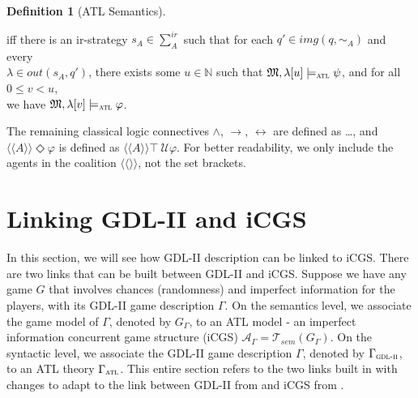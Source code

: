 \documentclass{article}
\theoremstyle{theorem}
\theoremstyle{lemma}
\theoremstyle{definition}
\newtheorem{definition}{Definition}[section]
\theoremstyle{remark}
\begin{document}
\begin{definition}[ATL Semantics]
\begin{tabbing}
        \>\hspace{1cm} iff there is an ir-strategy $s_A \in \sum_{A}^{ir}$ such that for each $q' \in img(q, \sim_A)$ and every \\
        \>\hspace{1cm} $\lambda \in out(s_A, q')$, there exists some $u \in \mathbb{N}$ such that $\mathfrak{M}, \lambda[u] \models_\textsc{atl} \psi$,  and for all $0 \leq v < u$, \\
        \>\hspace{1cm} we have $\mathfrak{M}, \lambda[v] \models_\textsc{atl} \varphi$.
    \end{tabbing}
    The remaining classical logic connectives $\wedge$, $\rightarrow$, $\leftrightarrow$ are defined as \ldots, and $\langle{\langle{A} \rangle}\rangle \Diamond \varphi$ is defined as $\langle{\langle {A}\rangle}\rangle \top \: \mathcal{U} \varphi$. For better readability, we only include the agents in the coalition $\langle{\langle{}\rangle}\rangle$, not the set brackets.
\end{definition}



\section{Linking GDL-II and iCGS}
\par In this section, we will see how GDL-II description can be linked to iCGS. There are two links that can be built between GDL-II and iCGS. Suppose we have any game $G$ that involves chances (randomness) and imperfect information for the players, with its GDL-II game description $\Gamma$. On the semantics level, we associate the game model of $\Gamma$, denoted by $G_\Gamma$, to an ATL model - an imperfect information concurrent game structure (iCGS) $\mathcal{A}_\Gamma = \mathcal{T}_\textit{sem}(G_\Gamma)$. On the syntactic level, we associate the GDL-II game description $\Gamma$, denoted by $\Gamma_\textsc{gdl-ii}$, to an ATL theory $\Gamma_\textsc{atl}$. This entire section refers to the two links built in \citep{GDLpaper} with changes to adapt to the link between GDL-II from \citep{gdlii} and iCGS from \citep{cgs}.
\end{document}
